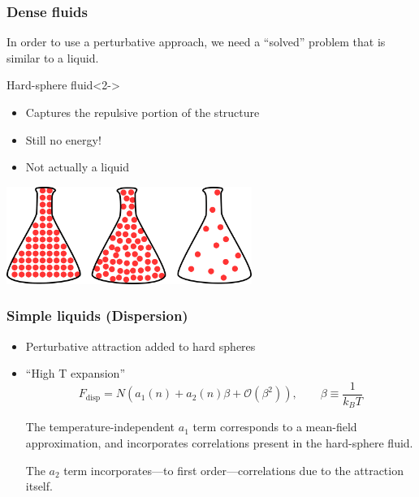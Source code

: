 
\begin{frame}
  \frametitle{Dense fluids}
  In order to use a perturbative approach, we need a ``solved''
  problem that is similar to a liquid.
  \begin{block}{Hard-sphere fluid}<2->
    \begin{itemize}
    \item Captures the repulsive portion of the structure
    \item Still no energy!
    \item Not actually a liquid
    \end{itemize}
    \begin{center}
      \includegraphics[width=8cm]{figs/hard-spheres}
    \end{center}
  \end{block}
\end{frame}

\begin{frame}
  \frametitle{Simple liquids (Dispersion)}
  \begin{itemize}
  \item Perturbative attraction added to hard spheres
  \item ``High T expansion''
    \[
    F_\text{disp} = N\left(a_1(n) + a_2(n)\beta + \mathcal{O}(\beta^2)\right),
    \quad \quad \beta \equiv \frac{1}{k_BT}
    \]

    \vspace{1em} The temperature-independent $a_1$ term corresponds to
    a mean-field approximation, and incorporates correlations present
    in the hard-sphere fluid.
    \vspace{1em}

    The $a_2$ term incorporates---to first order---correlations due to
    the attraction itself.
  \end{itemize}
\end{frame}

